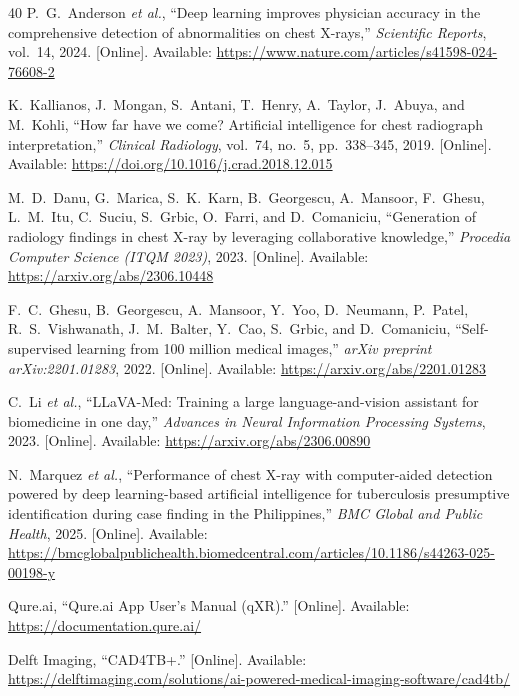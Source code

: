 \documentclass[conference, letterpaper]{IEEEtran}
\begin{document}
\begin{thebibliography}{40}
P.~G.~Anderson \textit{et al.}, ``Deep learning improves physician accuracy in the comprehensive detection of abnormalities on chest X-rays,'' \textit{Scientific Reports}, vol.~14, 2024. [Online]. Available: \url{https://www.nature.com/articles/s41598-024-76608-2}

K.~Kallianos, J.~Mongan, S.~Antani, T.~Henry, A.~Taylor, J.~Abuya, and M.~Kohli, ``How far have we come? Artificial intelligence for chest radiograph interpretation,'' \textit{Clinical Radiology}, vol.~74, no.~5, pp.~338--345, 2019. [Online]. Available: \url{https://doi.org/10.1016/j.crad.2018.12.015}

M.~D.~Danu, G.~Marica, S.~K.~Karn, B.~Georgescu, A.~Mansoor, F.~Ghesu, L.~M.~Itu, C.~Suciu, S.~Grbic, O.~Farri, and D.~Comaniciu, ``Generation of radiology findings in chest X-ray by leveraging collaborative knowledge,'' \textit{Procedia Computer Science (ITQM 2023)}, 2023. [Online]. Available: \url{https://arxiv.org/abs/2306.10448}

F.~C.~Ghesu, B.~Georgescu, A.~Mansoor, Y.~Yoo, D.~Neumann, P.~Patel, R.~S.~Vishwanath, J.~M.~Balter, Y.~Cao, S.~Grbic, and D.~Comaniciu, ``Self-supervised learning from 100 million medical images,'' \textit{arXiv preprint arXiv:2201.01283}, 2022. [Online]. Available: \url{https://arxiv.org/abs/2201.01283}

C.~Li \textit{et al.}, ``LLaVA-Med: Training a large language-and-vision assistant for biomedicine in one day,'' \textit{Advances in Neural Information Processing Systems}, 2023. [Online]. Available: \url{https://arxiv.org/abs/2306.00890}

N.~Marquez \textit{et al.}, ``Performance of chest X-ray with computer-aided detection powered by deep learning-based artificial intelligence for tuberculosis presumptive identification during case finding in the Philippines,'' \textit{BMC Global and Public Health}, 2025. [Online]. Available: \url{https://bmcglobalpublichealth.biomedcentral.com/articles/10.1186/s44263-025-00198-y}

Qure.ai, ``Qure.ai App User's Manual (qXR).'' [Online]. Available: \url{https://documentation.qure.ai/}

Delft Imaging, ``CAD4TB+.'' [Online]. Available: \url{https://delftimaging.com/solutions/ai-powered-medical-imaging-software/cad4tb/}


\end{thebibliography}
\end{document}
